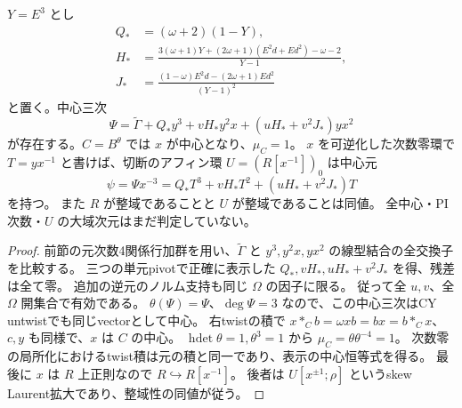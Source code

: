 \begin{proposition}[中心三次とアフィン切断]
\label{prop:cubic-third-root-unit-boundary-L-central-Psi}
$Y=E^3$ とし
\begin{align*}
 Q_*&=(\omega+2)(1-Y),\\
 H_*&=\frac{3(\omega+1)Y+(2\omega+1)(E^2d+Ed^2)-\omega-2}{Y-1},\\
 J_*&=\frac{(1-\omega)E^2d-(2\omega+1)Ed^2}{(Y-1)^2}
\end{align*}
と置く。中心三次
\[
 \Psi=\widetilde\Gamma+Q_*y^3+vH_*y^2x+(uH_*+v^2J_*)yx^2
\]
が存在する。$C=B^\theta$ では $x$ が中心となり、$\mu_C=1$。
$x$ を可逆化した次数零環で $T=yx^{-1}$ と書けば、切断のアフィン環
$U=(R[x^{-1}])_0$ は中心元
\[
 \psi=\Psi x^{-3}=Q_*T^3+vH_*T^2+(uH_*+v^2J_*)T
\]
を持つ。
また $R$ が整域であることと $U$ が整域であることは同値。
全中心・PI次数・$U$ の大域次元はまだ判定していない。
\end{proposition}
\begin{proof}
前節の元次数4関係行加群を用い、$\widetilde\Gamma$ と
$y^3,y^2x,yx^2$ の線型結合の全交換子を比較する。
三つの単元pivotで正確に表示した $Q_*,vH_*,uH_*+v^2J_*$ を得、残差は全て零。
追加の逆元のノルム支持も同じ $\Omega$ の因子に限る。
従って全 $u,v$、全 $\Omega$ 開集合で有効である。
$\theta(\Psi)=\Psi$、$\deg\Psi=3$ なので、この中心三次はCY untwistでも同じvectorとして中心。
右twistの積で $x*_C b=\omega xb=bx=b*_C x$、$c,y$ も同様で、$x$ は $C$ の中心。
$\operatorname{hdet}\theta=1,\theta^3=1$ から $\mu_C=\theta\theta^{-4}=1$。
次数零の局所化におけるtwist積は元の積と同一であり、表示の中心恒等式を得る。
最後に $x$ は $R$ 上正則なので $R\hookrightarrow R[x^{-1}]$。
後者は $U[x^{\pm1};\rho]$ というskew Laurent拡大であり、整域性の同値が従う。
\end{proof}
